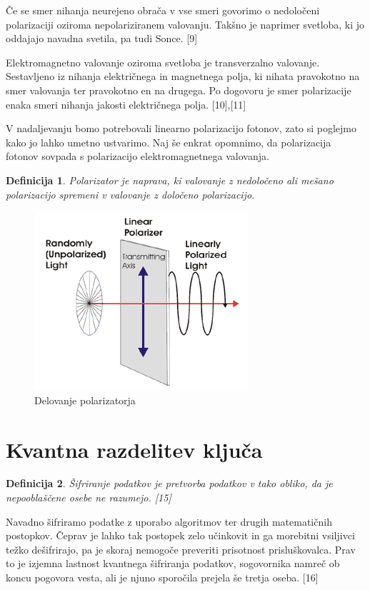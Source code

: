 \documentclass[A4paper, 11pt]{article}
\newtheorem{definicija}{Definicija}
\begin{document}
Če se smer nihanja neurejeno obrača v vse smeri govorimo o nedoločeni polarizaciji oziroma nepolariziranem valovanju. Takšno je naprimer svetloba, ki jo oddajajo navadna svetila, pa tudi Sonce. [9]

Elektromagnetno valovanje oziroma svetloba je transverzalno valovanje. Sestavljeno iz nihanja električnega in magnetnega polja, ki nihata pravokotno na smer valovanja ter pravokotno en na drugega. Po dogovoru je smer polarizacije enaka smeri nihanja jakosti električnega polja. [10],[11]

V nadaljevanju bomo potrebovali linearno polarizacijo fotonov, zato si poglejmo kako jo lahko umetno ustvarimo. Naj še enkrat opomnimo, da polarizacija fotonov sovpada s polarizacijo elektromagnetnega valovanja. 

\begin{definicija}
Polarizator je naprava, ki valovanje z nedoločeno ali mešano polarizacijo spremeni v valovanje z določeno polarizacijo.
\end{definicija}

\begin{figure}[h]
\centering
\caption{Delovanje polarizatorja}
\includegraphics[scale=0.75]{linear-figure-1}
\end{figure}



\section{Kvantna razdelitev ključa}

\begin{definicija}
Šifriranje podatkov je pretvorba podatkov v tako obliko, da je nepooblaščene osebe ne razumejo. [15]
\end{definicija}

Navadno šifriramo podatke z uporabo algoritmov ter drugih matematičnih postopkov. Čeprav je lahko tak postopek zelo učinkovit in ga morebitni vsiljivci težko dešifrirajo, pa je skoraj nemogoče preveriti prisotnost prisluškovalca. Prav to je izjemna lastnost kvantnega šifriranja podatkov, sogovornika namreč ob koncu pogovora vesta, ali je njuno sporočila prejela še tretja oseba. [16]
\end{document}
